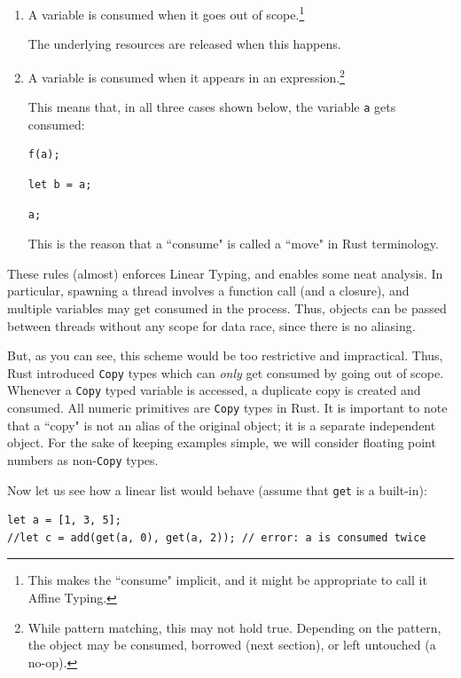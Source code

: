 \documentclass[11pt]{report}
\begin{document}
\begin{enumerate}
\item A variable is consumed when it goes out of scope.\footnote{This makes the ``consume" implicit, and it might be appropriate to call it Affine Typing.}

The underlying resources are released when this happens.
\item A variable is consumed when it appears in an expression.\footnote{While pattern matching, this may not hold true. Depending on the pattern, the object may be consumed, borrowed (next section), or left untouched (a no-op).}

This means that, in all three cases shown below, the variable \texttt{a} gets consumed:

\begin{lstlisting}
f(a);
\end{lstlisting}

\begin{lstlisting}
let b = a;
\end{lstlisting}

\begin{lstlisting}
a;
\end{lstlisting}

This is the reason that a ``consume" is called a ``move" in Rust terminology.
\end{enumerate}

These rules (almost) enforces Linear Typing, and enables some neat analysis. In particular, spawning a thread involves a function call (and a closure), and multiple variables may get consumed in the process. Thus, objects can be passed between threads without any scope for data race, since there is no aliasing.

But, as you can see, this scheme would be too restrictive and impractical. Thus, Rust introduced \texttt{Copy} types which can \textit{only} get consumed by going out of scope. Whenever a \texttt{Copy} typed variable is accessed, a duplicate copy is created and consumed. All numeric primitives are \texttt{Copy} types in Rust. It is important to note that a ``copy" is not an alias of the original object; it is a separate independent object. For the sake of keeping examples simple, we will consider floating point numbers as non-\texttt{Copy} types.

Now let us see how a linear list would behave (assume that \texttt{get} is a built-in):

\begin{lstlisting}
let a = [1, 3, 5];
//let c = add(get(a, 0), get(a, 2)); // error: a is consumed twice
\end{lstlisting}
\end{document}
